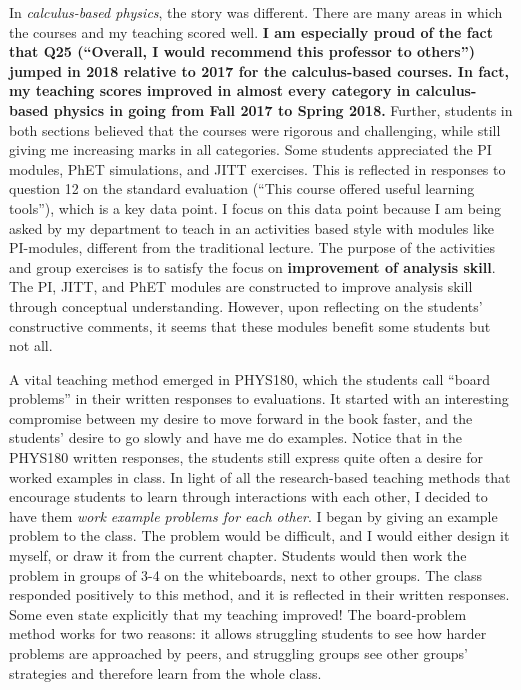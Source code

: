 \documentclass[../../main.tex]{subfiles}
\begin{document}
In \textit{calculus-based physics}, the story was different.  There are many areas in which the courses and my teaching scored well.  \textbf{I am especially proud of the fact that Q25 (``Overall, I would recommend this professor to others'') jumped in 2018 relative to 2017 for the calculus-based courses.  In fact, my teaching scores improved in almost every category in calculus-based physics in going from Fall 2017 to Spring 2018.}  Further, students in both sections believed that the courses were rigorous and challenging, while still giving me increasing marks in all categories.  Some students appreciated the PI modules, PhET simulations, and JITT exercises.  This is reflected in responses to question 12 on the standard evaluation (``This course offered useful learning tools''), which is a key data point.  I focus on this data point because I am being asked by my department to teach in an activities based style with modules like PI-modules, different from the traditional lecture.  The purpose of the activities and group exercises is to satisfy the focus on \textbf{improvement of analysis skill}.  The PI, JITT, and PhET modules are constructed to improve analysis skill through conceptual understanding.  However, upon reflecting on the students' constructive comments, it seems that these modules benefit some students but not all. \\ \hspace{0.1cm}

A vital teaching method emerged in PHYS180, which the students call ``board problems'' in their written responses to evaluations.  It started with an interesting compromise between my desire to move forward in the book faster, and the students' desire to go slowly and have me do examples.  Notice that in the PHYS180 written responses, the students still express quite often a desire for worked examples in class.  In light of all the research-based teaching methods that encourage students to learn through interactions with each other, I decided to have them \textit{work example problems for each other}.  I began by giving an example problem to the class.  The problem would be difficult, and I would either design it myself, or draw it from the current chapter.  Students would then work the problem in groups of 3-4 on the whiteboards, next to other groups.  The class responded positively to this method, and it is reflected in their written responses.  Some even state explicitly that my teaching improved!  The board-problem method works for two reasons: it allows struggling students to see how harder problems are approached by peers, and struggling groups see other groups' strategies and therefore learn from the whole class.  \\ \hspace{0.1cm}
\end{document}
